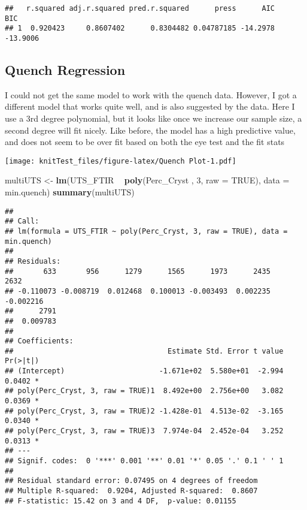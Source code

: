 \documentclass[]{article}
\newenvironment{Shaded}{\begin{snugshade}}{\end{snugshade}}
\newcommand{\DataTypeTok}[1]{\textcolor[rgb]{0.13,0.29,0.53}{#1}}
\newcommand{\DecValTok}[1]{\textcolor[rgb]{0.00,0.00,0.81}{#1}}
\newcommand{\KeywordTok}[1]{\textcolor[rgb]{0.13,0.29,0.53}{\textbf{#1}}}
\newcommand{\NormalTok}[1]{#1}
\newcommand{\OperatorTok}[1]{\textcolor[rgb]{0.81,0.36,0.00}{\textbf{#1}}}
\newcommand{\OtherTok}[1]{\textcolor[rgb]{0.56,0.35,0.01}{#1}}
\newcommand{\StringTok}[1]{\textcolor[rgb]{0.31,0.60,0.02}{#1}}
\begin{document}
\begin{verbatim}
##   r.squared adj.r.squared pred.r.squared      press      AIC      BIC
## 1  0.920423     0.8607402      0.8304482 0.04787185 -14.2978 -13.9006
\end{verbatim}

\hypertarget{quench-regression}{%
\subsection{Quench Regression}\label{quench-regression}}

I could not get the same model to work with the quench data. However, I
got a different model that works quite well, and is also suggested by
the data. Here I use a 3rd degree polynomial, but it looks like once we
increase our sample size, a second degree will fit nicely. Like before,
the model has a high predictive value, and does not seem to be over fit
based on both the eye test and the fit stats

\texttt{[image: knitTest\_files/figure-latex/Quench Plot-1.pdf]}

\begin{Shaded}
\begin{Highlighting}[]
\NormalTok{multiUTS <-}\StringTok{ }\KeywordTok{lm}\NormalTok{(UTS_FTIR }\OperatorTok{~}\StringTok{ }\KeywordTok{poly}\NormalTok{(Perc_Cryst , }\DecValTok{3}\NormalTok{, }\DataTypeTok{raw =} \OtherTok{TRUE}\NormalTok{), }\DataTypeTok{data =}\NormalTok{ min.quench)}
\KeywordTok{summary}\NormalTok{(multiUTS)}
\end{Highlighting}
\end{Shaded}

\begin{verbatim}
## 
## Call:
## lm(formula = UTS_FTIR ~ poly(Perc_Cryst, 3, raw = TRUE), data = min.quench)
## 
## Residuals:
##       633       956      1279      1565      1973      2435      2632 
## -0.110073 -0.008719  0.012468  0.100013 -0.003493  0.002235 -0.002216 
##      2791 
##  0.009783 
## 
## Coefficients:
##                                    Estimate Std. Error t value Pr(>|t|)  
## (Intercept)                      -1.671e+02  5.580e+01  -2.994   0.0402 *
## poly(Perc_Cryst, 3, raw = TRUE)1  8.492e+00  2.756e+00   3.082   0.0369 *
## poly(Perc_Cryst, 3, raw = TRUE)2 -1.428e-01  4.513e-02  -3.165   0.0340 *
## poly(Perc_Cryst, 3, raw = TRUE)3  7.974e-04  2.452e-04   3.252   0.0313 *
## ---
## Signif. codes:  0 '***' 0.001 '**' 0.01 '*' 0.05 '.' 0.1 ' ' 1
## 
## Residual standard error: 0.07495 on 4 degrees of freedom
## Multiple R-squared:  0.9204, Adjusted R-squared:  0.8607 
## F-statistic: 15.42 on 3 and 4 DF,  p-value: 0.01155
\end{verbatim}
\end{document}
